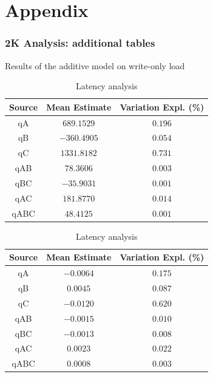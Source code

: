 \documentclass[11pt,a4paper]{article}
\begin{document}
\section*{Appendix} \label{sec:appendix}

\subsubsection*{2K Analysis: additional tables} \label{sec:app-2k-analysis-add-plots}
\begin{table}[h]
\centering
{Results of the additive model on write-only load}
\begin{minipage}{.5\textwidth}
\centering
	\begin{tabular}{|c|c|c|}
	\hline 
	{\small Source} & {\small Mean Estimate} & {\small Variation Expl. (\%)} \\ 
	\hline 
	qA & $689.1529$ & $0.196$ \\ 
	\hline 
	qB & $-360.4905$ & $0.054$ \\ 
	\hline 
	qC & $1331.8182$ & $0.731$ \\ 
	\hline 
	qAB & $78.3606$ & $0.003$ \\ 
	\hline 
	qBC & $-35.9031$ & $0.001$ \\ 
	\hline 
	qAC & $181.8770$ & $0.014$ \\ 
	\hline 
	qABC & $48.4125$ & $0.001$ \\ 
	\hline 
	\end{tabular} \caption{Throughput analysis} \label{tab:2k-add-wo-tpt}
\end{minipage}%
\begin{minipage}{.5\textwidth}
\centering
	\begin{tabular}{|c|c|c|}
	\hline 
	{\small Source} & {\small Mean Estimate} & {\small Variation Expl. (\%)} \\ 
	\hline 
	qA & $-0.0064$ & $0.175$ \\ 
	\hline 
	qB & $0.0045$ & $0.087$ \\ 
	\hline 
	qC & $-0.0120$ & $0.620$ \\ 
	\hline 
	qAB & $-0.0015$ & $0.010$ \\ 
	\hline 
	qBC & $-0.0013$ & $0.008$ \\ 
	\hline 
	qAC & $0.0023$ & $0.022$ \\ 
	\hline 
	qABC & $0.0008$ & $0.003$ \\ 
	\hline 
	\end{tabular} \caption{Latency analysis} \label{tab:2k-add-wo-lat}
\end{minipage}
\end{table}\label{tab:2k-add-wo}
\end{document}
